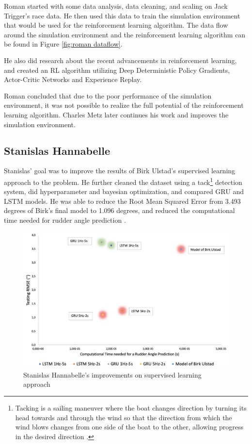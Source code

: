 \documentclass[12pt,twoside]{report}
\begin{document}
Roman started with some data analysis, data cleaning, and scaling on Jack Trigger's race data. He then used this data to train the simulation environment that would be used for the reinforcement learning algorithm. The data flow around the simulation environment and the reinforcement learning algorithm can be found in Figure \ref{fig:roman dataflow}.

He also did research about the recent advancements in reinforcement learning, and created an RL algorithm utilizing Deep Deterministic Policy Gradients, Actor-Critic Networks and Experience Replay.

Roman concluded that due to the poor performance of the simulation environment, it was not possible to realize the full potential of the reinforcement learning algorithm. Charles Metz later continues his work and improves the simulation environment.

\subsection{Stanislas Hannabelle}
Stanislas' goal was to improve the results of Birk Ulstad's supervised learning approach to the problem. He further cleaned the dataset using a tack\footnote{Tacking is a sailing maneuver where the boat changes direction by turning its head towards and through the wind so that the direction from which the wind blows changes from one side of the boat to the other, allowing progress in the desired direction \cite{wiki:tack}.} detection system, did hyperparameter and bayesian optimization, and compared GRU and LSTM models. He was able to reduce the Root Mean Squared Error from 3.493 degrees of Birk's final model to 1.096 degrees, and reduced the computational time needed for rudder angle prediction \cite{stan}.

\begin{figure}[h]
\centering
\includegraphics[width = 0.8\hsize]{figures/stan results.png}
\caption{Stanislas Hannabelle's improvements on supervised learning approach}
\label{fig:stan results}
\end{figure}
\end{document}
